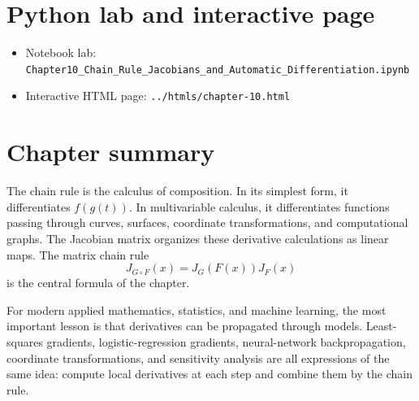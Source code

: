 \documentclass[11pt]{article}
\begin{document}
\section{Python lab and interactive page}

\begin{itemize}
  \item Notebook lab: \texttt{\small Chapter10\_Chain\_Rule\_Jacobians\_and\_Automatic\_Differentiation.ipynb}
  \item Interactive HTML page: \texttt{../htmls/chapter-10.html}
\end{itemize}

\section{Chapter summary}

The chain rule is the calculus of composition. In its simplest form, it differentiates $f(g(t))$. In multivariable calculus, it differentiates functions passing through curves, surfaces, coordinate transformations, and computational graphs. The Jacobian matrix organizes these derivative calculations as linear maps. The matrix chain rule
\[
J_{G\circ F}(x)=J_G(F(x))J_F(x)
\]
is the central formula of the chapter.

For modern applied mathematics, statistics, and machine learning, the most important lesson is that derivatives can be propagated through models. Least-squares gradients, logistic-regression gradients, neural-network backpropagation, coordinate transformations, and sensitivity analysis are all expressions of the same idea: compute local derivatives at each step and combine them by the chain rule.
\end{document}
